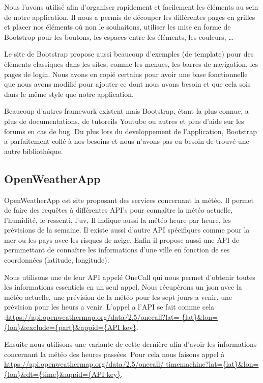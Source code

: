 \documentclass[a4paper, 12pt, french]{article}
\begin{document}
			Nous l'avons utilisé afin d'organiser rapidement et facilement
			les éléments au sein de notre application. Il nous a permis de
     		découper les différentes pages en grilles et placer nos éléments où non le
			souhaitons, utiliser les mise en forme de Bootstrop pour les boutons,
			les espaces entre les éléments, les couleurs, \ldots

			Le site de Bootstrap propose aussi beaucoup d'exemples \cite*{Bootstrap-Exemples}
			(de template) pour des éléments classiques dans les sites, comme
			les menues, les barres de navigation, les pages de login. 
			Nous avons en copié certains pour avoir une base fonctionnelle 
			que nous avons modifié pour
			ajouter ce dont nous avons besoin et que cela sois dans le même
			style que notre application.

			Beaucoup d'autres framework existent mais Bootstrap, étant la plus connue, a plus de
			documentations, de tutoreils Youtube ou autres et plus d'aide sur les forums en cas de
			bug. Du plus lors du developpement de l'application, Bootstrap a parfaitement
			collé à nos besoins et nous n'avons pas eu besoin de trouvé une autre bibliothéque.

		\subsection{OpenWeatherApp}
			OpenWeatherApp \cite*{OpenWeatherApp} est site proposant des services 
      		concernant la météo. Il permet
			de faire des requêtes à différentes API's pour connaître la météo actuelle,
			l'humidité, le ressenti, l'uv, Il indique aussi la météo heure par heure, 
			les prévisions de la semaine. Il existe aussi d'autre API spécifiques comme 
			pour la mer ou les pays avec les risques de neige. Enfin il propose aussi 
			une API de permmettant de connaître les informations d'une ville
			en fonction de ses coordonnées (latitude, longitude).

			Nous utilisons une de leur API appelé OneCall \cite*{OpenWeatherApp-OneCall}
			qui nous permet d'obtenir toutes les informations essentiels en un seul appel.
			Nous récupèrons un json avec la météo actuelle, une prévision de la météo pour
			les sept jours a venir, une prévision pour les heurs a venir. L'appel a l'API se
			fait comme cela :\url{https://api.openweathermap.org/data/2.5/onecall?lat=
			{lat}&lon={lon}&exclude={part}&appid={API key}}.

			Ensuite nous utilisons une variante de cette dernière afin d'avoir les informations
			concernant la météo des heures passées. Pour cela nous faisons appel à 
			\url{https://api.openweathermap.org/data/2.5/onecall/
			timemachine?lat={lat}&lon={lon}&dt={time}&appid={API key}}.
\end{document}
